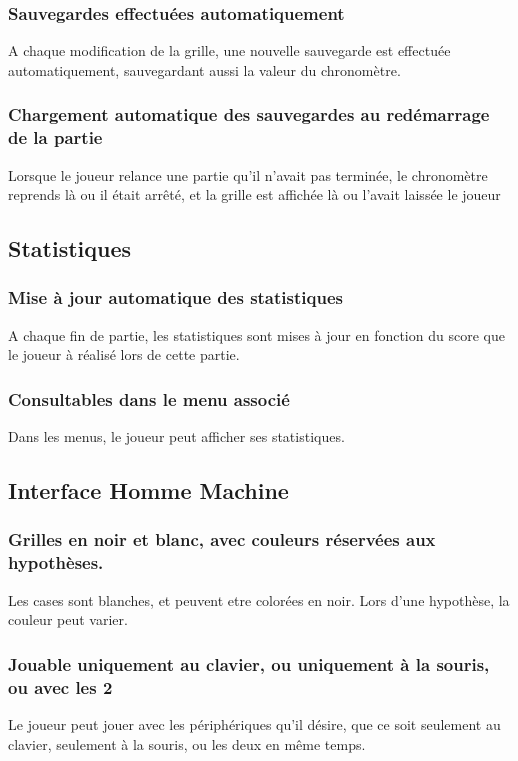 \documentclass{report}
\begin{document}
		\subsubsection{Sauvegardes effectuées automatiquement}
			A chaque modification de la grille, une nouvelle sauvegarde est effectuée automatiquement, sauvegardant aussi la valeur du chronomètre.
		\subsubsection{Chargement automatique des sauvegardes au redémarrage de la partie}
			Lorsque le joueur relance une partie qu'il n'avait pas terminée, le chronomètre reprends là ou il était arrêté, et la grille est affichée là ou l'avait laissée le joueur
			
	\subsection{Statistiques}
		\subsubsection{Mise à jour automatique des statistiques}
			A chaque fin de partie, les statistiques sont mises à jour en fonction du score que le joueur à réalisé lors de cette partie.	
		\subsubsection{Consultables dans le menu associé}
			Dans les menus, le joueur peut afficher ses statistiques.
			
	\subsection{Interface Homme Machine}
		\subsubsection{Grilles en noir et blanc, avec couleurs réservées aux hypothèses.}
			Les cases sont blanches, et peuvent etre colorées en noir. Lors d'une hypothèse, la couleur peut varier.
		\subsubsection{Jouable uniquement au clavier, ou uniquement à la souris, ou avec les 2}
			Le joueur peut jouer avec les périphériques qu'il désire, que ce soit seulement au clavier, seulement à la souris, ou les deux en même temps.
\end{document}
